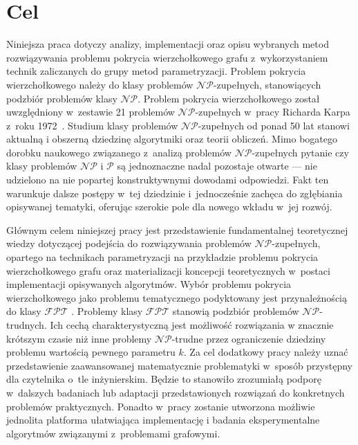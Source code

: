 \section{Cel}\label{Section_Aim}
\par{
  Niniejsza praca dotyczy analizy, implementacji oraz opisu wybranych metod rozwiązywania problemu pokrycia wierzchołkowego grafu z~wykorzystaniem technik zaliczanych do grupy metod parametryzacji.
  Problem pokrycia wierzchołkowego należy do klasy problemów $\mathcal{NP}$-zupełnych, stanowiących podzbiór problemów klasy $\mathcal{NP}$.
  Problem pokrycia wierzchołkowego został uwzględniony w~zestawie 21 problemów $\mathcal{NP}$-zupełnych w~pracy Richarda Karpa z~roku 1972~\cite{DBLP:Karp10}.
  Studium klasy problemów $\mathcal{NP}$-zupełnych od ponad 50 lat stanowi aktualną i obszerną dziedzinę algorytmiki oraz teorii obliczeń.
  Mimo bogatego dorobku naukowego związanego z~analizą problemów $\mathcal{NP}$-zupełnych pytanie czy klasy problemów $\mathcal{NP}$ i $\mathcal{P}$ są jednoznaczne nadal pozostaje otwarte --- nie udzielono na nie popartej konstruktywnymi dowodami odpowiedzi.
  Fakt ten warunkuje dalsze postępy w~tej dziedzinie i~jednocześnie zachęca do zgłębiania opisywanej tematyki, oferując szerokie pole dla nowego wkładu w~jej rozwój.
}
\par{
  Głównym celem niniejszej pracy jest przedstawienie fundamentalnej teoretycznej wiedzy dotyczącej podejścia do rozwiązywania problemów $\mathcal{NP}$-zupełnych, opartego na technikach parametryzacji na przykładzie problemu pokrycia wierzchołkowego grafu oraz materializacji koncepcji teoretycznych w~postaci implementacji opisywanych algorytmów.
  Wybór problemu pokrycia wierzchołkowego jako problemu tematycznego podyktowany jest przynależnością do klasy $\mathcal{FPT}$ .
  Problemy klasy $\mathcal{FPT}$ stanowią podzbiór problemów $\mathcal{NP}$-trudnych.
  Ich cechą charakterystyczną jest możliwość rozwiązania w znacznie krótszym czasie niż inne problemy $\mathcal{NP}$-trudne przez ograniczenie dziedziny problemu wartością pewnego parametru $k$.
  Za cel dodatkowy pracy należy uznać przedstawienie zaawansowanej matematycznie problematyki w~sposób przystępny dla czytelnika o~tle inżynierskim.
  Będzie to stanowiło zrozumiałą podporę w~dalszych badaniach lub adaptacji przedstawionych rozwiązań do konkretnych problemów praktycznych.
  Ponadto w~pracy zostanie utworzona możliwie jednolita platforma ułatwiająca implementację i badania eksperymentalne algorytmów związanymi z~problemami grafowymi.
}
